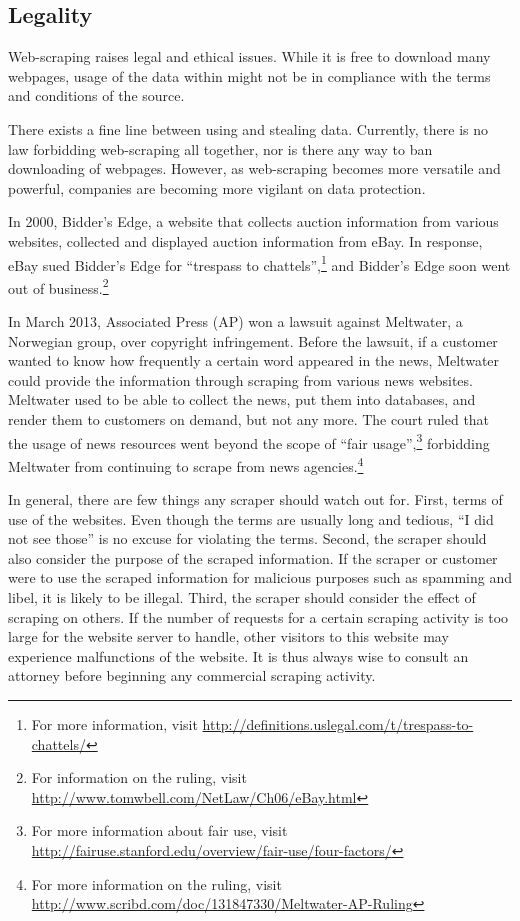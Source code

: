 \documentclass[12pt]{report}
\begin{document}
\subsection{Legality}

Web-scraping raises legal and ethical issues. While it is free to download many webpages, usage of the data within might not be in compliance with the terms and conditions of the source. 

There exists a fine line between using and stealing data. Currently, there is no law forbidding web-scraping all together, nor is there any way to ban downloading of webpages. However, as web-scraping becomes more versatile and powerful, companies are becoming more vigilant on data protection. 

In 2000, Bidder's Edge, a website that collects auction information from various websites, collected and displayed auction information from eBay. In response, eBay sued Bidder's Edge for ``trespass to chattels'',\footnote{For more information, visit \url{http://definitions.uslegal.com/t/trespass-to-chattels/}} and Bidder's Edge soon went out of business.\footnote{For information on the ruling, visit \url{http://www.tomwbell.com/NetLaw/Ch06/eBay.html}}

In March 2013, Associated Press (AP) won a lawsuit against Meltwater, a Norwegian group, over copyright infringement. Before the lawsuit, if a customer wanted to know how frequently a certain word appeared in the news, Meltwater could provide the information through scraping from various news websites. Meltwater used to be able to collect the news, put them into databases, and render them to customers on demand, but not any more. The court ruled that the usage of news resources went beyond the scope of ``fair usage'',\footnote{For more information about fair use, visit \url{http://fairuse.stanford.edu/overview/fair-use/four-factors/}} forbidding Meltwater from continuing to scrape from news agencies.\footnote{For more information on the ruling, visit \url{http://www.scribd.com/doc/131847330/Meltwater-AP-Ruling}}

In general, there are few things any scraper should watch out for. First, terms of use of the websites. Even though the terms are usually long and tedious, ``I did not see those'' is no excuse for violating the terms. Second, the scraper should also consider the purpose of the scraped information. If the scraper or customer were to use the scraped information for malicious purposes such as spamming and libel, it is likely to be illegal. Third, the scraper should consider the effect of scraping on others. If the number of requests for a certain scraping activity is too large for the website server to handle, other visitors to this website may experience malfunctions of the website. It is thus always wise to consult an attorney before beginning any commercial scraping activity.
\end{document}
